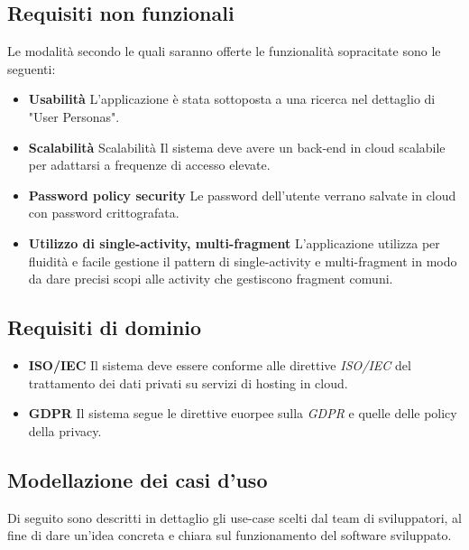 \subsection{Requisiti non funzionali}
Le modalità secondo le quali saranno offerte le funzionalità sopracitate sono le seguenti:
\begin{itemize}
  \item \textbf{Usabilità} L'applicazione è stata sottoposta a una ricerca nel dettaglio di
        "User Personas".
  \item \textbf{Scalabilità}
        Scalabilità Il sistema deve avere un back-end in cloud scalabile per adattarsi a frequenze di accesso elevate.
  \item \textbf{Password policy security} Le password dell'utente verrano salvate in
        cloud con password crittografata.
  \item \textbf{Utilizzo di single-activity, multi-fragment} L'applicazione utilizza per
        fluidità e facile gestione il pattern di single-activity e multi-fragment in modo
        da dare precisi scopi alle activity che gestiscono fragment comuni.
\end{itemize}
\subsection{Requisiti di dominio}
\begin{itemize}
  \item \textbf{ISO/IEC} Il sistema deve essere conforme alle direttive \textit{ISO/IEC} del trattamento dei dati privati su servizi di hosting in cloud.
  \item \textbf{GDPR} Il sistema segue le direttive euorpee sulla \textit{GDPR} e quelle delle policy della privacy.
\end{itemize}
\subsection{Modellazione dei casi d'uso}
Di seguito sono descritti in dettaglio gli use-case scelti dal team di sviluppatori, al fine di dare un'idea concreta e chiara sul funzionamento del software sviluppato.
